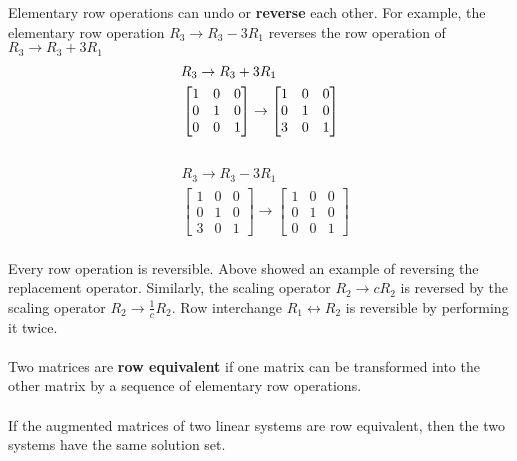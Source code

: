 Elementary row operations can undo or \textbf{reverse} each other. For example, the elementary row operation $R_3 \rightarrow R_3 - 3R_1$ reverses the row operation of $R_3 \rightarrow R_3 + 3R_1$
\[
  \begin{aligned}
    &R_3 \rightarrow R_3 + 3R_1 \\
    &\begin{bmatrix}
      1 & 0 & 0 \\
      0 & 1 & 0 \\
      0 & 0 & 1
    \end{bmatrix} \rightarrow
    \begin{bmatrix}
      1 & 0 & 0 \\
      0 & 1 & 0 \\
      3 & 0 & 1
    \end{bmatrix}
  \end{aligned} \\
\] \\
\[
  \begin{aligned}
    &R_3 \rightarrow R_3 - 3R_1 \\
    &\begin{bmatrix}
      1 & 0 & 0 \\
      0 & 1 & 0 \\
      3 & 0 & 1
    \end{bmatrix} \rightarrow
    \begin{bmatrix}
      1 & 0 & 0 \\
      0 & 1 & 0 \\
      0 & 0 & 1
    \end{bmatrix}
  \end{aligned}
\] \\
Every row operation is reversible. Above showed an example of reversing the replacement operator. 
Similarly, the scaling operator $R_2 \rightarrow cR_2$ is reversed by the scaling operator $R_2 \rightarrow \frac{1}{c}R_2$. 
Row interchange $R_1 \leftrightarrow R_2$ is reversible by performing it twice. \\\\
Two matrices are \textbf{row equivalent} if one matrix can be transformed into the other matrix by a sequence of elementary row operations. \\\\
If the augmented matrices of two linear systems are row equivalent, then the two systems have the same solution set.
